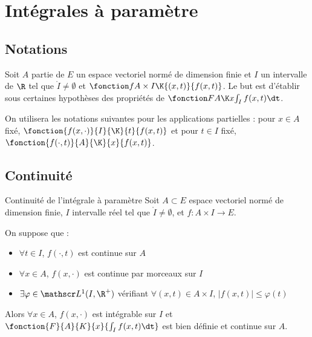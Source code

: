 \section{Intégrales à paramètre}
\subsection{Notations }

Soit $A$ partie de $E$ un espace vectoriel normé de dimension finie et $I$ un 
intervalle de $\R$ tel que $\mathring I \neq \emptyset$ et 
$\fonction f {A \times I} \K {(x, t)}{f(x, t)}$. Le but est d'établir sous 
certaines hypothèses des propriétés de $\fonction F A \K x {\int_I f(x, t) \dt}$.

On utilisera les notations suivantes pour les applications partielles : 
pour $x \in A$ fixé, $\fonction {f(x, \cdot)}{I}{\K}{t}{f(x, t)}$ et pour $t \in I$ fixé, $\fonction {f(\cdot, t)}{A}{\K}{x}{f(x, t)}$.

\subsection{Continuité }

\begin{theoreme}{Continuité de l'intégrale à paramètre}{}
    Soit $A \subset E$ espace vectoriel normé de dimension finie, $I$ intervalle réel tel que 
    $\mathring I \neq \emptyset$, et $f : A \times I \to E$. 

    On suppose que : 
    \begin{itemize}
        \item $\forall t \in I$, $f(\cdot, t)$ est continue sur $A$
        \item $\forall x \in A$, $f(x, \cdot)$ est continue par morceaux sur $I$ 
        \item $\exists \varphi \in \mathscr L^1(I, \R^+)$ vérifiant $\forall (x, t) \in A \times I$, $|f(x, t)| \leqslant \varphi(t)$
    \end{itemize}

    Alors $\forall x \in A$, $f(x, \cdot)$ est intégrable sur $I$ et $\fonction{F}{A}{K}{x}{\int_I f(x, t) \dt}$ est 
    bien définie et continue sur $A$.
\end{theoreme}

